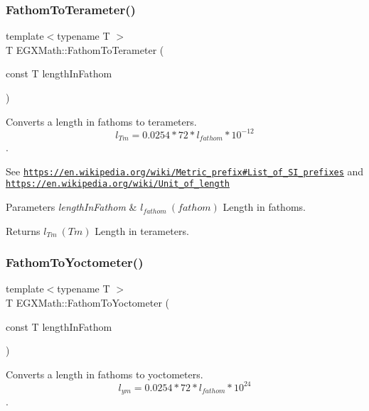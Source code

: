 \subsubsection{\texorpdfstring{Fathom\+To\+Terameter()}{FathomToTerameter()}}
{\footnotesize\ttfamily template$<$typename T $>$ \\
T E\+G\+X\+Math\+::\+Fathom\+To\+Terameter (\begin{DoxyParamCaption}\item[{const T}]{length\+In\+Fathom }\end{DoxyParamCaption})}



Converts a length in fathoms to terameters. \[ l_{Tm}=0.0254 * 72 * l_{fathom} * 10^{-12} \]. 

See \href{https://en.wikipedia.org/wiki/Metric_prefix#List_of_SI_prefixes}{\tt https\+://en.\+wikipedia.\+org/wiki/\+Metric\+\_\+prefix\#\+List\+\_\+of\+\_\+\+S\+I\+\_\+prefixes} and \href{https://en.wikipedia.org/wiki/Unit_of_length}{\tt https\+://en.\+wikipedia.\+org/wiki/\+Unit\+\_\+of\+\_\+length} 
\begin{DoxyParams}{Parameters}
{\em length\+In\+Fathom} & $ l_{fathom}\ (fathom)$ Length in fathoms. \\
\hline
\end{DoxyParams}
\begin{DoxyReturn}{Returns}
$ l_{Tm}\ (Tm)$ Length in terameters. 
\end{DoxyReturn}
\mbox{\label{group___e_g_x_math-_conversions-_length_conversions-_nautical-_fathom-_s_i_ga0b22b9db2c224dadfd62934797f14090}} 
\subsubsection{\texorpdfstring{Fathom\+To\+Yoctometer()}{FathomToYoctometer()}}
{\footnotesize\ttfamily template$<$typename T $>$ \\
T E\+G\+X\+Math\+::\+Fathom\+To\+Yoctometer (\begin{DoxyParamCaption}\item[{const T}]{length\+In\+Fathom }\end{DoxyParamCaption})}



Converts a length in fathoms to yoctometers. \[ l_{ym}=0.0254 * 72 * l_{fathom} * 10^{24} \]. 

